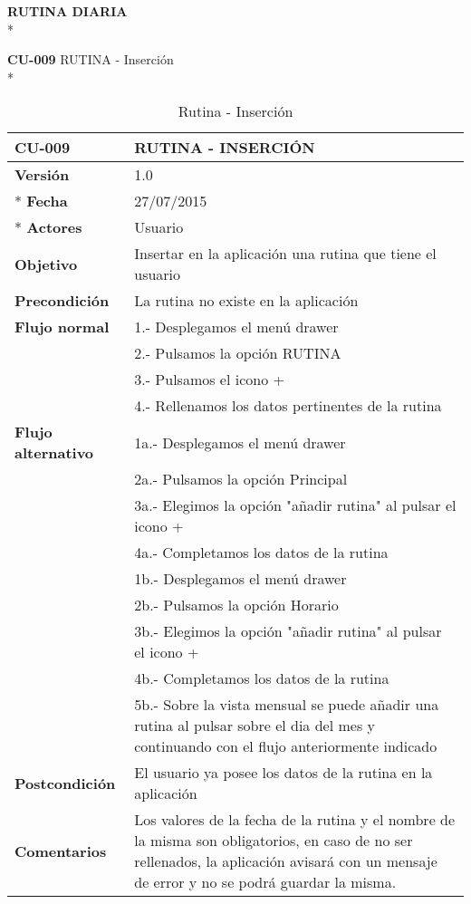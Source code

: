 \documentclass[../pfc.tex]{subfiles}
\begin{document}
	
	\textbf{RUTINA DIARIA}\\*
		
	\textbf{CU-009}	RUTINA - Inserción\\*
		
		\begin{table}[H]
			\centering
			\begin{tabular}[t]{|p{3cm}|p{9.5cm}|}
				\hline \textbf{CU-009} & \textbf{RUTINA - INSERCIÓN} \\*
				\hline\hline \textbf{Versión} & 1.0 \\ *
				\hline\hline \textbf{Fecha} & 27/07/2015 \\ *
				\hline\textbf{Actores} 	& Usuario\\*
				\hline \textbf{Objetivo} & Insertar en la aplicación una rutina que tiene el usuario\\* 			
				\hline \textbf{Precondición} & La rutina no existe en la aplicación\\* 
				\hline \textbf{Flujo normal} & 1.- Desplegamos el menú drawer \\* 
				& 2.- Pulsamos la opción RUTINA\\*	
				& 3.- Pulsamos el icono +\\*	
				& 4.- Rellenamos los datos pertinentes de la rutina\\*	
				\hline \textbf{Flujo alternativo} & 1a.- Desplegamos el menú drawer \\* 
				& 2a.- Pulsamos la opción Principal \\*	
				& 3a.- Elegimos la opción "añadir rutina" al pulsar el icono +\\*	
				& 4a.- Completamos los datos de la rutina\\*	
				& 1b.- Desplegamos el menú drawer \\* 
				& 2b.- Pulsamos la opción Horario \\*	
				& 3b.- Elegimos la opción "añadir rutina" al pulsar el icono +\\*	
				& 4b.- Completamos los datos de la rutina\\*	
				& 5b.- Sobre la vista mensual se puede añadir una rutina al pulsar sobre el dia del mes y continuando con el flujo anteriormente indicado\\*	
				\hline \textbf{Postcondición} & El usuario ya posee los datos de la rutina en la aplicación \\* 
				\hline \textbf{Comentarios}   & Los valores de la fecha de la rutina y el nombre de la misma son obligatorios, en caso de no ser rellenados, la aplicación avisará con un mensaje de error y no se podrá guardar la misma.\\*
				\hline
			\end{tabular}
			\caption{Rutina - Inserción}
			\label{tabla:caso009}
		\end{table}
		
\end{document}

